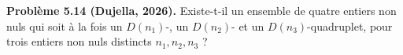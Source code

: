 \textbf{Problème 5.14 (Dujella, 2026).} Existe-t-il un ensemble de quatre entiers non nuls qui soit à la fois un $D(n_1)$-, un $D(n_2)$- et un $D(n_3)$-quadruplet, pour trois entiers non nuls distincts $n_1,n_2,n_3$ ?
